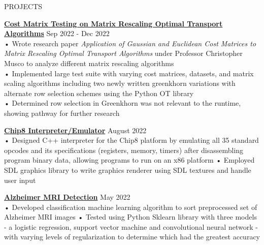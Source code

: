 \documentclass{resume} %
\begin{document}
\begin{rSection}{PROJECTS}

\textbf {\href{https://github.com/aminoa/gaussian_pot_tests}{Cost Matrix Testing on Matrix Rescaling Optimal Transport Algorithms}} \hfill Sep 2022 - Dec 2022 \\
• Wrote research paper \emph{Application of Gaussian and Euclidean Cost Matrices to Matrix Rescaling Optimal Transport Algorithms} under Professor Christopher Musco to analyze different matrix rescaling algorithms\\ 
• Implemented large test suite with varying cost matrices, datasets, and matrix scaling algorithms including two newly written greenkhorn variations with alternate row selection schemes using the Python OT library \\ 
• Determined row selection in Greenkhorn was not relevant to the runtime, showing pathway for further research

\textbf{\href{https://github.com/aminoa/chip8}{Chip8 Interpreter/Emulator}} \hfill August 2022 \\
• Designed C++ interpreter for the Chip8 platform by emulating all 35 standard opcodes and its specifications (registers, memory, timers) after disassembling program binary data, allowing programs to run on an x86 platform \newline
• Employed SDL graphics library to write graphics renderer using SDL textures and handle user input \smallskip

\textbf{\href{https://github.com/trietvuive/MRI_Alzheimer}{Alzheimer MRI Detection}} \hfill May 2022 \\
• Developed classification machine learning algorithm to sort preprocessed set of Alzheimer MRI images
\newline
• Tested using Python Sklearn library with three models - a logistic regression, support vector machine and convolutional neural network - with varying levels of regularization to determine which had the greatest accuracy 


\end{rSection}
\end{document}
